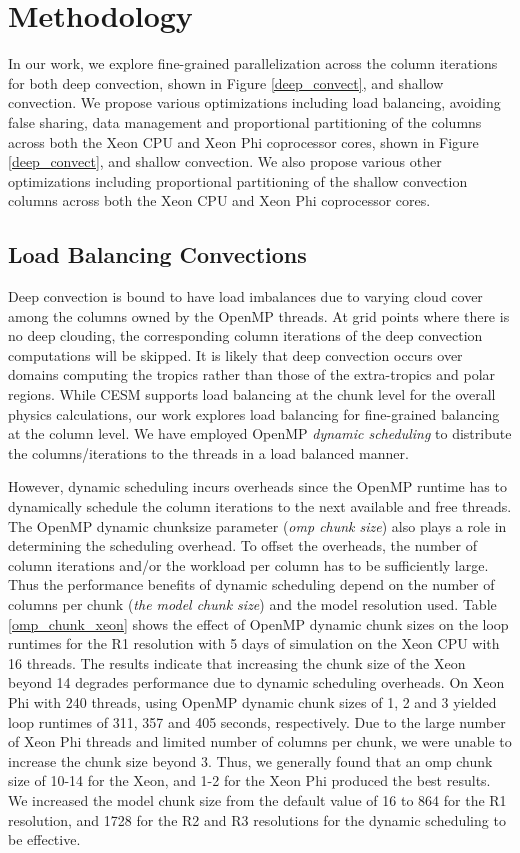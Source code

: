 \section{Methodology}
\label{opt}

In our work, we explore fine-grained  parallelization  across the column iterations for both deep convection, shown in Figure \ref{deep_convect}, and shallow convection. We propose various optimizations including load balancing, avoiding false sharing, data management and proportional partitioning of the columns across both the Xeon CPU and Xeon Phi coprocessor cores, shown in Figure \ref{deep_convect}, and shallow convection. We also propose various other  optimizations including proportional partitioning of the shallow convection columns across both the Xeon CPU and Xeon Phi coprocessor cores.

\subsection{Load Balancing Convections}

Deep convection is bound to have load imbalances due to varying cloud cover among the columns owned by the OpenMP threads. At grid points where there is no deep clouding, the corresponding column iterations of the deep convection computations will be skipped. It is likely that deep convection occurs over domains computing the tropics rather than those of the extra-tropics and polar regions. While CESM supports load balancing at the chunk level for the overall physics calculations, our work explores load balancing for fine-grained balancing at the column level. We have employed OpenMP {\em dynamic scheduling} to distribute the columns/iterations to the threads in a load balanced manner. 

However, dynamic scheduling incurs overheads since the OpenMP runtime has to dynamically schedule the column iterations to the next available and free threads. The OpenMP dynamic chunksize parameter ({\em omp chunk size}) also plays a role in determining the scheduling overhead. To offset the overheads, the number of column iterations and/or the workload per column has to be sufficiently large. Thus the performance benefits of dynamic scheduling depend on the number of columns per chunk ({\em the model chunk size}) and the model resolution used. Table \ref{omp_chunk_xeon} shows the effect of OpenMP dynamic chunk sizes on the loop runtimes for the R1 resolution with 5 days of simulation on the Xeon CPU with 16 threads. The results indicate that increasing the chunk size of the Xeon beyond 14 degrades performance due to dynamic scheduling overheads. On Xeon Phi with 240 threads, using OpenMP dynamic chunk sizes of 1, 2 and 3 yielded loop runtimes of 311, 357 and 405 seconds, respectively. Due to the large number of Xeon Phi threads and limited number of columns per chunk, we were unable to increase the chunk size beyond 3. Thus, we generally found that an omp chunk size of 10-14 for the Xeon, and 1-2 for the Xeon Phi produced the best results.  We increased the model chunk size from the default value of 16 to 864 for the R1 resolution, and 1728 for the R2 and R3 resolutions for the dynamic scheduling to be effective.


